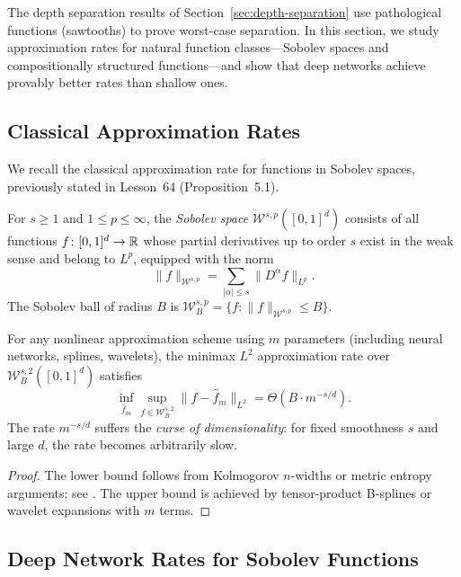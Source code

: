 \documentclass[11pt,a4paper]{article}
\begin{document}
The depth separation results of Section~\ref{sec:depth-separation}
use pathological functions (sawtooths) to prove worst-case separation.
In this section, we study approximation rates for natural function
classes---Sobolev spaces and compositionally structured functions---and
show that deep networks achieve provably better rates than shallow ones.

\subsection{Classical Approximation Rates}
\label{sec:classical-rates}

We recall the classical approximation rate for functions in Sobolev
spaces, previously stated in Lesson~64 (Proposition~5.1).

\begin{definition}
\label{def:sobolev}
For $s \ge 1$ and $1 \le p \le \infty$, the \emph{Sobolev space}
$\mathcal{W}^{s,p}([0,1]^d)$ consists of all functions
$f \colon [0,1]^d \to \mathbb{R}$ whose partial derivatives up to order $s$
exist in the weak sense and belong to $L^p$, equipped with the norm
\[
  \|f\|_{\mathcal{W}^{s,p}} = \sum_{|\alpha| \le s}
  \|D^\alpha f\|_{L^p}.
\]
The Sobolev ball of radius $B$ is $\mathcal{W}^{s,p}_B = \{f :
\|f\|_{\mathcal{W}^{s,p}} \le B\}$.
\end{definition}

\begin{proposition}
\label{prop:classical-minimax}
For any nonlinear approximation scheme using $m$ parameters (including
neural networks, splines, wavelets), the minimax $L^2$ approximation
rate over $\mathcal{W}^{s,2}_B([0,1]^d)$ satisfies
\[
  \inf_{\hat{f}_m} \sup_{f \in \mathcal{W}^{s,2}_B}
  \|f - \hat{f}_m\|_{L^2}
  = \Theta(B \cdot m^{-s/d}).
\]
The rate $m^{-s/d}$ suffers the \emph{curse of dimensionality}: for
fixed smoothness $s$ and large $d$, the rate becomes arbitrarily slow.
\end{proposition}

\begin{proof}
The lower bound follows from Kolmogorov $n$-widths or metric entropy
arguments; see \citet{pinkus1999}.  The upper bound is achieved by
tensor-product B-splines or wavelet expansions with $m$ terms.
\end{proof}

\subsection{Deep Network Rates for Sobolev Functions}
\end{document}
